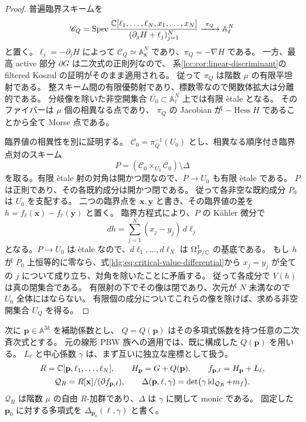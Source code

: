 \begin{proof}
普遍臨界スキームを
\[
 \mathscr C_Q=
 \operatorname{Spec}
 \frac{\mathbb C[\ell_1,\ldots,\ell_N,x_1,\ldots,x_N]}
      {(\partial_jH+\ell_j)_{j=1}^N}
 \xrightarrow{\ \pi_Q\ }\mathbb A^N_\ell
\]
と置く。$\ell_j=-\partial_jH$ によって
$\mathscr C_Q\simeq\mathbb A^N_{\mathbf x}$ であり、$\pi_Q=-\nabla H$ である。
一方、最高 active 部分 $\partial G$ は二次式の正則列なので、
系\ref{lcc:cor:linear-discriminant}の filtered Koszul の証明がそのまま適用される。
従って $\pi_Q$ は階数 $\mu$ の有限平坦射である。
整スキーム間の有限優勢射であり、標数零なので関数体拡大は分離的である。
分岐像を除いた非空開集合 $U_0\subset\mathbb A^N_\ell$ 上では有限 \`etale となる。
そのファイバーは $\mu$ 個の相異なる点であり、
$\pi_Q$ の Jacobian が $-\operatorname{Hess}H$ であることから全て Morse 点である。

臨界値の相異性を別に証明する。
$\mathscr C_0=\pi_Q^{-1}(U_0)$ とし、相異なる順序付き臨界点対のスキーム
\[
 P=(\mathscr C_0\times_{U_0}\mathscr C_0)\setminus\Delta
\]
を取る。有限 \`etale 射の対角は開かつ閉なので、$P\to U_0$ も有限 \`etale である。
$P$ は正則であり、その各既約成分は開かつ閉である。
従って各非空な既約成分 $P_0$ は $U_0$ を支配する。
二つの臨界点を $\mathbf x,\mathbf y$ と書き、その臨界値の差を
$h=f_\ell(\mathbf x)-f_\ell(\mathbf y)$ と置く。
臨界方程式により、$P$ の K\"ahler 微分で
\begin{equation}\label{ldg:eq:critical-value-differential}
 dh=\sum_{j=1}^N(x_j-y_j)\,d\ell_j
\end{equation}
となる。$P\to U_0$ は \`etale なので、$d\ell_1,\ldots,d\ell_N$ は
$\Omega^1_{P/\mathbb C}$ の基底である。
もし $h$ が $P_0$ 上恒等的に零なら、式\eqref{ldg:eq:critical-value-differential}から
$x_j=y_j$ が全ての $j$ について成り立ち、対角を除いたことに矛盾する。
従って各成分で $V(h)$ は真の閉集合である。
有限射の下でその像は閉であり、次元が $N$ 未満なので $U_0$ 全体にはならない。
有限個の成分についてこれらの像を除けば、求める非空開集合 $U_Q$ を得る。
\end{proof}

次に $\mathbf p\in\mathbb A^{3k}$ を補助係数とし、
$Q=Q(\mathbf p)$ はその多項式係数を持つ任意の二次斉次式とする。
元の線形 PBW 族への適用では、既に構成した $Q(\mathbf p)$ を用いる。
$L_\ell$ と中心係数 $\gamma$ は、まず互いに独立な座標として扱う。
\[
 \begin{gathered}
 R=\mathbb C[\mathbf p,\ell_1,\ldots,\ell_N],\qquad
 H_{\mathbf p}=G+Q(\mathbf p),\qquad
 f_{\mathbf p,\ell}=H_{\mathbf p}+L_\ell,\\
 \mathcal Q_R=R[\mathbf x]/(\partial f_{\mathbf p,\ell}),\qquad
 \Delta(\mathbf p,\ell,\gamma)
   =\det\bigl(\gamma\operatorname{id}_{\mathcal Q_R}+m_f\bigr).
 \end{gathered}
\]
$\mathcal Q_R$ は階数 $\mu$ の自由 $R$-加群であり、$\Delta$ は $\gamma$ に関して monic である。
固定した $\mathbf p_0$ に対する多項式を $\Delta_{\mathbf p_0}(\ell,\gamma)$ と書く。

